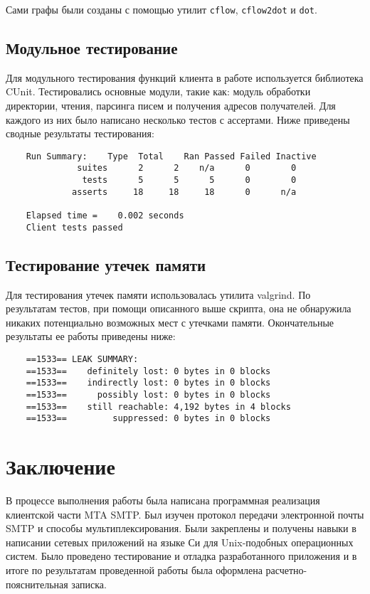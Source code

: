 \documentclass[a4paper,12pt]{report}
\begin{document}
Сами графы были созданы с помощью утилит \texttt{cflow}, \texttt{cflow2dot} и \texttt{dot}.


\section{Модульное тестирование}

Для модульного тестирования функций клиента в работе используется библиотека CUnit. Тестировались основные модули, такие как: модуль обработки директории, чтения, парсинга писем и получения адресов получателей. Для каждого из них было написано несколько тестов с ассертами. Ниже приведены сводные результаты тестирования:
\begin{verbatim}
    Run Summary:    Type  Total    Ran Passed Failed Inactive
              suites      2      2    n/a      0        0
               tests      5      5      5      0        0
             asserts     18     18     18      0      n/a

    Elapsed time =    0.002 seconds
    Client tests passed
\end{verbatim}



\section{Тестирование утечек памяти}

Для тестирования утечек памяти использовалась утилита valgrind. По результатам тестов, при помощи описанного выше скрипта, она не обнаружила никаких потенциально возможных мест с утечками памяти. Окончательные результаты ее работы приведены ниже:
\begin{verbatim}
    ==1533== LEAK SUMMARY:
    ==1533==    definitely lost: 0 bytes in 0 blocks
    ==1533==    indirectly lost: 0 bytes in 0 blocks
    ==1533==      possibly lost: 0 bytes in 0 blocks
    ==1533==    still reachable: 4,192 bytes in 4 blocks
    ==1533==         suppressed: 0 bytes in 0 blocks

\end{verbatim}


\clearpage
\chapter*{Заключение}

В процессе выполнения работы была написана программная реализация клиентской части MTA SMTP. Был изучен протокол передачи электронной почты SMTP и способы мультиплексирования. Были закреплены и получены навыки в написании сетевых приложений на языке Си для Unix-подобных операционных систем. Было проведено тестирование и отладка разработанного приложения и в итоге по результатам проведенной работы была оформлена расчетно-пояснительная записка.
\end{document}
